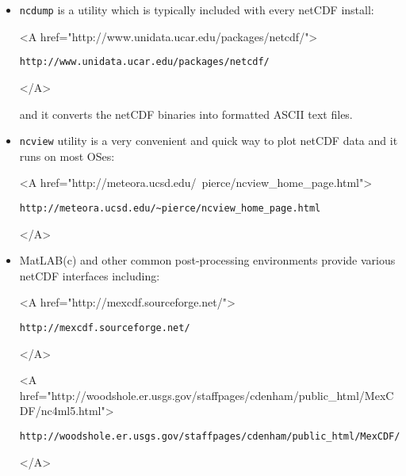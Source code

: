 \begin{itemize}
\item \texttt{ncdump} is a utility which is typically included
  with every netCDF install:
  \begin{rawhtml} <A href="http://www.unidata.ucar.edu/packages/netcdf/"> \end{rawhtml}
\begin{verbatim}
http://www.unidata.ucar.edu/packages/netcdf/
\end{verbatim}
  \begin{rawhtml} </A> \end{rawhtml} and it converts the netCDF
  binaries into formatted ASCII text files.

\item \texttt{ncview} utility is a very convenient and quick way
  to plot netCDF data and it runs on most OSes:
  \begin{rawhtml} <A href="http://meteora.ucsd.edu/~pierce/ncview_home_page.html"> \end{rawhtml}
\begin{verbatim}
http://meteora.ucsd.edu/~pierce/ncview_home_page.html
\end{verbatim}
  \begin{rawhtml} </A> \end{rawhtml}
  
\item MatLAB(c) and other common post-processing environments provide
  various netCDF interfaces including:
  \begin{rawhtml} <A href="http://mexcdf.sourceforge.net/"> \end{rawhtml}
\begin{verbatim}
http://mexcdf.sourceforge.net/
\end{verbatim}
  \begin{rawhtml} </A> \end{rawhtml}
  \begin{rawhtml} <A href="http://woodshole.er.usgs.gov/staffpages/cdenham/public_html/MexCDF/nc4ml5.html"> \end{rawhtml}
\begin{verbatim}
http://woodshole.er.usgs.gov/staffpages/cdenham/public_html/MexCDF/nc4ml5.html
\end{verbatim}
  \begin{rawhtml} </A> \end{rawhtml}
\end{itemize}

